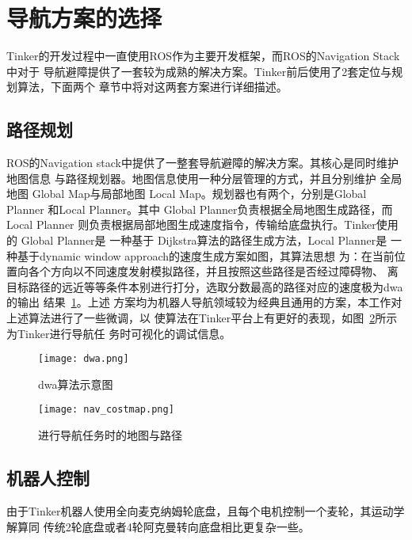 \section{导航方案的选择}

Tinker的开发过程中一直使用ROS作为主要开发框架，而ROS的Navigation Stack中对于
导航避障提供了一套较为成熟的解决方案。Tinker前后使用了2套定位与规划算法，下面两个
章节中将对这两套方案进行详细描述。

\subsection{路径规划}

ROS的Navigation stack中提供了一整套导航避障的解决方案。其核心是同时维护地图信息
与路径规划器。地图信息使用一种分层管理的方式\cite{lu2014layered}，并且分别维护
全局地图 Global Map与局部地图 Local Map。规划器也有两个，分别是Global Planner
和Local Planner。其中 Global Planner负责根据全局地图生成路径，而 Local Planner
则负责根据局部地图生成速度指令，传输给底盘执行。Tinker使用的 Global Planner是
一种基于 Dijkstra算法\cite{deng2012fuzzy}的路径生成方法，Local Planner是
一种基于dynamic window approach的速度生成方案\cite{fox1997dynamic}如图，其算法思想
为：在当前位置向各个方向以不同速度发射模拟路径，并且按照这些路径是否经过障碍物、
离目标路径的远近等等条件本别进行打分，选取分数最高的路径对应的速度极为dwa的输出
结果~\ref{fig:dwa}。上述
方案均为机器人导航领域较为经典且通用的方案，本工作对上述算法进行了一些微调，以
使算法在Tinker平台上有更好的表现，如图~\ref{fig:nav_costmap}所示为Tinker进行导航任
务时可视化的调试信息。


\begin{figure}[ht] %
  \centering
  \texttt{[image: dwa.png]}
  \caption{dwa算法示意图}
  \label{fig:dwa}
\end{figure}


\begin{figure}[ht] %
  \centering
  \texttt{[image: nav\_costmap.png]}
  \caption{进行导航任务时的地图与路径}
  \label{fig:nav_costmap}
\end{figure}

\subsection{机器人控制}

由于Tinker机器人使用全向麦克纳姆轮底盘，且每个电机控制一个麦轮，其运动学解算同
传统2轮底盘或者4轮阿克曼转向底盘相比更复杂一些。


